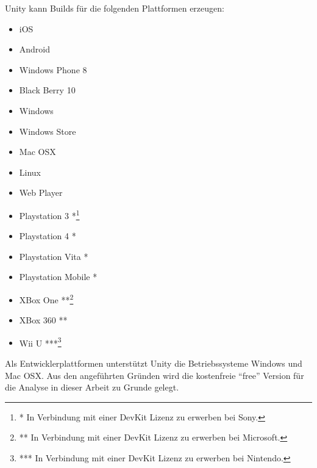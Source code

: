 \documentclass[pagesize, paper=a4, fontsize=12pt, titlepage=true, headings=small, headnosepline, abstractoff, liststotoc, nochapterprefix, plainheadsepline, twoside]{scrreprt}
\begin{document}
Unity kann Builds für die folgenden Plattformen erzeugen:
\begin{itemize}
\item iOS
\item Android
\item Windows Phone 8
\item Black Berry 10
\item Windows
\item Windows Store
\item Mac OSX
\item Linux
\item Web Player
\item Playstation 3 *\footnote{* In Verbindung mit einer DevKit Lizenz zu erwerben bei Sony.}
\item Playstation 4 *
\item Playstation Vita *
\item Playstation Mobile *
\item XBox One **\footnote{** In Verbindung mit einer DevKit Lizenz zu erwerben bei Microsoft.}
\item XBox 360 **
\item Wii U  ***\footnote{*** In Verbindung mit einer DevKit Lizenz zu erwerben bei Nintendo.}
\end{itemize}

Als Entwicklerplattformen unterstützt Unity die Betriebssysteme Windows und Mac OSX. Aus den angeführten Gründen wird die kostenfreie “free” Version für die Analyse in dieser Arbeit zu Grunde gelegt.
\end{document}
